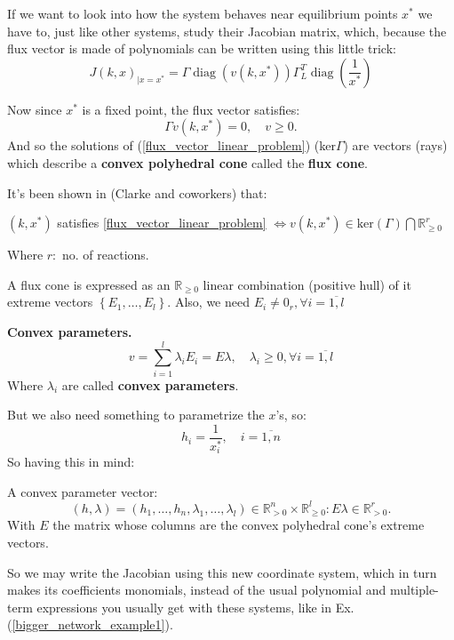 If we want to look into how the system behaves near equilibrium points $x^*$ we have to, just like other systems, study their Jacobian matrix, which, because the flux vector is made of polynomials can be written using this little trick:
\[
	J(k, x)_{\mid x=x^*}=\Gamma \operatorname{diag}\left(v\left(k, x^*\right)\right) \Gamma_L^T \operatorname{diag}\left(\frac{1}{x^*}\right)
\]

Now since $x^*$ is a fixed point, the flux vector satisfies:
\begin{equation}\label{flux_vector_linear_problem}
	\Gamma v(k,x^*) = 0, \quad v \geq 0.
\end{equation}
And so the solutions of (\ref{flux_vector_linear_problem}) (ker$\Gamma$) are vectors (rays) which describe a \textbf{convex polyhedral cone} called the \textbf{flux cone}.

It's been shown in (Clarke and coworkers) that:

$(k,x^*)$ satisfies \ref{flux_vector_linear_problem} $\iff  v(k,x^*)\in \text{ker}(\Gamma) \bigcap \mathbb{R}^r_{\geq 0}$

Where $r:$ no. of reactions.

A flux cone is expressed as an $\mathbb{R}_{\geq 0}$ linear combination (positive hull) of it extreme vectors $\left\{ E_1 , \ldots , E_l \right\}$. Also, we need $E_i \neq 0_r, \forall i = \overline{1,l}$

\begin{definition}\label{convex_params_definition}
	\textbf{Convex parameters.}
	\begin{equation}\label{flux_cone}
		\boxed{		v=\sum_{i=1}^l \lambda_i E_i=E \lambda, \quad \lambda_i \geq 0, \forall i = \overline{1,l} }
	\end{equation}
	Where $\lambda_i$ are called \textbf{convex parameters}.
\end{definition}
But we also need something to parametrize the $x$'s, so:
\begin{equation}\label{other_convex_parameters}
	\boxed{	h_i=\frac{1}{x_i^*}, \quad i = \overline{1,n} }
\end{equation}
So having this in mind:
\begin{definition}
	A convex parameter vector:
	\[
		(h, \lambda) = (h_1, \ldots, h_n , \lambda_1, \ldots , \lambda_l) \in \mathbb{R}_{>0}^n \times \mathbb{R}_{\geq 0}^{l} : E \lambda \in \mathbb{R}^r_{> 0}.
	\]
	With $E$ the matrix whose columns are the convex polyhedral cone's extreme vectors.
\end{definition}
So we may write the Jacobian using this new coordinate system, which in turn makes its coefficients monomials, instead of the usual polynomial and multiple-term expressions you usually get with these systems, like in Ex. (\ref{bigger_network_example1}).
\newcommand\eqCuzConvex{\stackrel{\mathclap{\normalfont\mbox{\ref{flux_vector_linear_problem}, \ref{convex_params_definition}}}}{=\joinrel=\joinrel=\joinrel=\joinrel=}}

